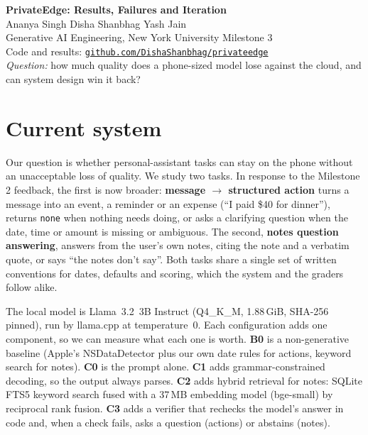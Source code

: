 \documentclass[10pt,letterpaper]{article}
\begin{document}
\begin{center}
{\fontsize{15}{18}\selectfont\bfseries PrivateEdge: Results, Failures and Iteration}\\[4pt]
Ananya Singh \quad Disha Shanbhag \quad Yash Jain\\[1pt]
Generative AI Engineering, New York University \quad Milestone 3\\[1pt]
Code and results: \href{https://github.com/DishaShanbhag/privateedge}{\texttt{github.com/DishaShanbhag/privateedge}}\\[1pt]
\textit{Question:} how much quality does a phone-sized model lose against the cloud, and can system design win it back?
\end{center}
\vspace{-4pt}

\section{Current system}
Our question is whether personal-assistant tasks can stay on the phone without an unacceptable loss of quality. We study two tasks. In response to the Milestone 2 feedback, the first is now broader: \textbf{message $\rightarrow$ structured action} turns a message into an event, a reminder or an expense (``I paid \$40 for dinner''), returns \texttt{none} when nothing needs doing, or asks a clarifying question when the date, time or amount is missing or ambiguous. The second, \textbf{notes question answering}, answers from the user's own notes, citing the note and a verbatim quote, or says ``the notes don't say''. Both tasks share a single set of written conventions for dates, defaults and scoring, which the system and the graders follow alike.

The local model is Llama~3.2~3B Instruct (Q4\_K\_M, 1.88\,GiB, SHA-256 pinned), run by llama.cpp at temperature~0. Each configuration adds one component, so we can measure what each one is worth. \textbf{B0} is a non-generative baseline (Apple's NSDataDetector plus our own date rules for actions, keyword search for notes). \textbf{C0} is the prompt alone. \textbf{C1} adds grammar-constrained decoding, so the output always parses. \textbf{C2} adds hybrid retrieval for notes: SQLite FTS5 keyword search fused with a 37\,MB embedding model (bge-small) by reciprocal rank fusion. \textbf{C3} adds a verifier that rechecks the model's answer in code and, when a check fails, asks a question (actions) or abstains (notes).
\end{document}
